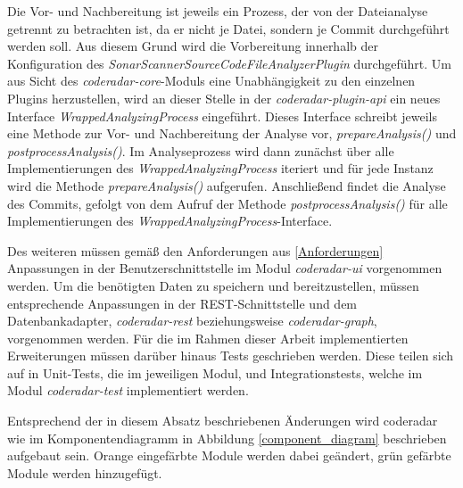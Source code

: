\documentclass[
	oneside,  %
	ngerman, 
	final, 
	11pt, 
	a4paper, 
	1.1headlines, 
	headinclude=false, 
	footinclude=false, 
	mpinclude=false, 
	pagesize, 
	onecolumn, 
	titlepage, 
	parskip=half, 
	headsepline, 
	chapterprefix=false, 
	version=first, 
	listof=totoc, 
	bibliography=totoc, 
	toc=graduated, 
	fleqn
]{scrbook}
\begin{document}
Die Vor- und Nachbereitung ist jeweils ein Prozess, der von der Dateianalyse getrennt zu betrachten ist, da er nicht je Datei, sondern je Commit durchgeführt werden soll.
Aus diesem Grund wird die Vorbereitung innerhalb der Konfiguration des \textit{SonarScannerSourceCodeFileAnalyzerPlugin} durchgeführt.
Um aus Sicht des \textit{coderadar-core}-Moduls eine Unabhängigkeit zu den einzelnen Plugins herzustellen, wird an dieser Stelle in der \textit{coderadar-plugin-api} ein neues Interface \textit{WrappedAnalyzingProcess} eingeführt.
Dieses Interface schreibt jeweils eine Methode zur Vor- und Nachbereitung der Analyse vor, \textit{prepareAnalysis()} und \textit{postprocessAnalysis()}.
Im Analyseprozess wird dann zunächst über alle Implementierungen des \textit{WrappedAnalyzingProcess} iteriert und für jede Instanz wird die Methode \textit{prepareAnalysis()} aufgerufen.
Anschließend findet die Analyse des Commits, gefolgt von dem Aufruf der Methode \textit{postprocessAnalysis()} für alle Implementierungen des \textit{WrappedAnalyzingProcess}-Interface.

Des weiteren müssen gemäß den Anforderungen aus \ref{Anforderungen} Anpassungen in der Benutzerschnittstelle im Modul \textit{coderadar-ui} vorgenommen werden.
Um die benötigten Daten zu speichern und bereitzustellen, müssen entsprechende Anpassungen in der \acs{REST}-Schnittstelle und dem Datenbankadapter, \textit{coderadar-rest} beziehungsweise \textit{coderadar-graph}, vorgenommen werden.
Für die im Rahmen dieser Arbeit implementierten Erweiterungen müssen darüber hinaus Tests geschrieben werden.
Diese teilen sich auf in Unit-Tests, die im jeweiligen Modul, und Integrationstests, welche im Modul \textit{coderadar-test} implementiert werden.

Entsprechend der in diesem Absatz beschriebenen Änderungen wird coderadar wie im Komponentendiagramm in Abbildung \ref{component_diagram} beschrieben aufgebaut sein.
Orange eingefärbte Module werden dabei geändert, grün gefärbte Module werden hinzugefügt.
\end{document}
